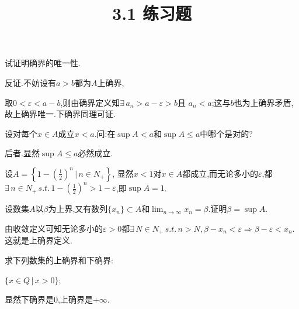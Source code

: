 \documentclass[windows,list,answers]{BHCexam}
\begin{document}
\everymath{\displaystyle}
\title{3.1 练习题}

\maketitle

\begin{questions}
    \question
    试证明确界的唯一性.
    \begin{solution}{1cm}
        \methodonly
        反证.不妨设有$a>b$都为$A$上确界,

        取$0<\varepsilon<a-b$,则由确界定义知$\exists\, a_n>a-\varepsilon>b$且
        $a_n<a$;这与$b$也为上确界矛盾,故上确界唯一.下确界同理可证.
    \end{solution}

    \question
    设对每个$x\in A$成立$x<a$.问:在$\sup A<a$和$\sup A\leqslant a$中哪个是对的?
    \begin{solution}{1cm}
        \methodonly
        后者.显然$\sup A\leqslant a$必然成立.

        设$A=\left\{1-(\frac{1}{2})^n\,\bigg\lvert\,n\in N_+\right\}$,
        显然$x<1$对$x\in A$都成立,而无论多小的$\varepsilon$,都$\exists
            \,n\in N_+\,s.t.\,1-(\frac{1}{2})^n>1-\varepsilon$,即$\sup A=1$.
    \end{solution}
    \question
    设数集$A$以$\beta$为上界,又有数列$\{x_n\}\subset A$和$\lim_{n\to\infty}x_n=\beta.$证明$\beta=\sup A$.
    \begin{solution}{1cm}
        \methodonly
        由收敛定义可知无论多小的$\varepsilon>0$都$\exists\,N\in N_+
            \,s.t.\,n>N,\beta-x_n<\varepsilon\Rightarrow\beta-\varepsilon<x_n$.
        这就是上确界定义.
    \end{solution}
    \question
    求下列数集的上确界和下确界:
    \begin{subquestions}
        \subquestion
        $\{x\in Q\,\lvert\, x>0\};$
        \begin{solution}{1cm}
            \methodonly
            显然下确界是0,上确界是$+\infty$.
        \end{solution}


\end{subquestions}
\end{questions}
\end{document}
